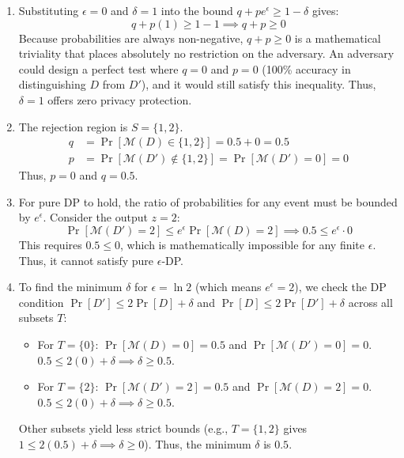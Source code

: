 \documentclass[12pt]{article}
\begin{document}
\begin{enumerate}
\begin{solution}
\begin{enumerate}
    \item[(b)] 
    Substituting $\epsilon = 0$ and $\delta = 1$ into the bound $q + p e^\epsilon \ge 1 - \delta$ gives:
    \[ q + p(1) \ge 1 - 1 \implies q + p \ge 0 \]
    Because probabilities are always non-negative, $q + p \ge 0$ is a mathematical triviality that places absolutely no restriction on the adversary. An adversary could design a perfect test where $q=0$ and $p=0$ (100\% accuracy in distinguishing $D$ from $D'$), and it would still satisfy this inequality. Thus, $\delta=1$ offers zero privacy protection.

    \item[(c)] 
    The rejection region is $S = \{1, 2\}$.
    \begin{align*}
        q &= \Pr[\mathcal{M}(D) \in \{1, 2\}] = 0.5 + 0 = 0.5 \\
        p &= \Pr[\mathcal{M}(D') \notin \{1, 2\}] = \Pr[\mathcal{M}(D') = 0] = 0
    \end{align*}
    Thus, $p = 0$ and $q = 0.5$.
    
    \item[(d)] 
    For pure DP to hold, the ratio of probabilities for any event must be bounded by $e^\epsilon$. Consider the output $z=2$:
    \[ \Pr[\mathcal{M}(D') = 2] \le e^\epsilon \Pr[\mathcal{M}(D) = 2] \implies 0.5 \le e^\epsilon \cdot 0 \]
    This requires $0.5 \le 0$, which is mathematically impossible for any finite $\epsilon$. Thus, it cannot satisfy pure $\epsilon$-DP.
    
    \item[(e)] 
    To find the minimum $\delta$ for $\epsilon = \ln 2$ (which means $e^\epsilon = 2$), we check the DP condition $\Pr[D'] \le 2\Pr[D] + \delta$ and $\Pr[D] \le 2\Pr[D'] + \delta$ across all subsets $T$:
    \begin{itemize}
        \item For $T = \{0\}$: $\Pr[\mathcal{M}(D) = 0] = 0.5$ and $\Pr[\mathcal{M}(D') = 0] = 0$. \\
        $0.5 \le 2(0) + \delta \implies \delta \ge 0.5$.
        \item For $T = \{2\}$: $\Pr[\mathcal{M}(D') = 2] = 0.5$ and $\Pr[\mathcal{M}(D) = 2] = 0$. \\
        $0.5 \le 2(0) + \delta \implies \delta \ge 0.5$.
    \end{itemize}
    Other subsets yield less strict bounds (e.g., $T=\{1,2\}$ gives $1 \le 2(0.5) + \delta \implies \delta \ge 0$). 
    Thus, the minimum $\delta$ is $0.5$.
    

\end{enumerate}
\end{solution}
\end{enumerate}
\end{document}
